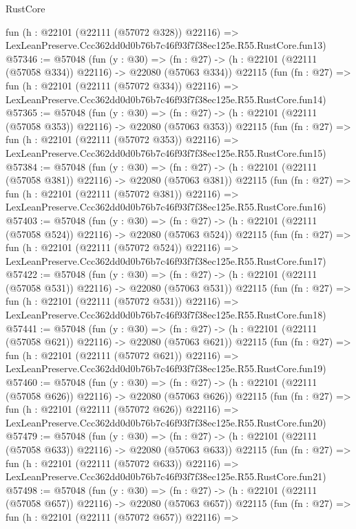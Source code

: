 \begin{lexlean}{RustCore}
\begin{coremodule}
    fun (h : @22101 (@22111 (@57072 @328)) @22116) =>
    LexLeanPreserve.Ccc362dd0d0b76b7c46f93f7f38ec125e.R55.RustCore.fun13)
@57346 := @57048
    (fun (y : @30) =>
    (fn : @27) -> (h : @22101 (@22111 (@57058 @334)) @22116) -> @22080 (@57063 @334))
    @22115
    (fun (fn : @27) =>
    fun (h : @22101 (@22111 (@57072 @334)) @22116) =>
    LexLeanPreserve.Ccc362dd0d0b76b7c46f93f7f38ec125e.R55.RustCore.fun14)
@57365 := @57048
    (fun (y : @30) =>
    (fn : @27) -> (h : @22101 (@22111 (@57058 @353)) @22116) -> @22080 (@57063 @353))
    @22115
    (fun (fn : @27) =>
    fun (h : @22101 (@22111 (@57072 @353)) @22116) =>
    LexLeanPreserve.Ccc362dd0d0b76b7c46f93f7f38ec125e.R55.RustCore.fun15)
@57384 := @57048
    (fun (y : @30) =>
    (fn : @27) -> (h : @22101 (@22111 (@57058 @381)) @22116) -> @22080 (@57063 @381))
    @22115
    (fun (fn : @27) =>
    fun (h : @22101 (@22111 (@57072 @381)) @22116) =>
    LexLeanPreserve.Ccc362dd0d0b76b7c46f93f7f38ec125e.R55.RustCore.fun16)
@57403 := @57048
    (fun (y : @30) =>
    (fn : @27) -> (h : @22101 (@22111 (@57058 @524)) @22116) -> @22080 (@57063 @524))
    @22115
    (fun (fn : @27) =>
    fun (h : @22101 (@22111 (@57072 @524)) @22116) =>
    LexLeanPreserve.Ccc362dd0d0b76b7c46f93f7f38ec125e.R55.RustCore.fun17)
@57422 := @57048
    (fun (y : @30) =>
    (fn : @27) -> (h : @22101 (@22111 (@57058 @531)) @22116) -> @22080 (@57063 @531))
    @22115
    (fun (fn : @27) =>
    fun (h : @22101 (@22111 (@57072 @531)) @22116) =>
    LexLeanPreserve.Ccc362dd0d0b76b7c46f93f7f38ec125e.R55.RustCore.fun18)
@57441 := @57048
    (fun (y : @30) =>
    (fn : @27) -> (h : @22101 (@22111 (@57058 @621)) @22116) -> @22080 (@57063 @621))
    @22115
    (fun (fn : @27) =>
    fun (h : @22101 (@22111 (@57072 @621)) @22116) =>
    LexLeanPreserve.Ccc362dd0d0b76b7c46f93f7f38ec125e.R55.RustCore.fun19)
@57460 := @57048
    (fun (y : @30) =>
    (fn : @27) -> (h : @22101 (@22111 (@57058 @626)) @22116) -> @22080 (@57063 @626))
    @22115
    (fun (fn : @27) =>
    fun (h : @22101 (@22111 (@57072 @626)) @22116) =>
    LexLeanPreserve.Ccc362dd0d0b76b7c46f93f7f38ec125e.R55.RustCore.fun20)
@57479 := @57048
    (fun (y : @30) =>
    (fn : @27) -> (h : @22101 (@22111 (@57058 @633)) @22116) -> @22080 (@57063 @633))
    @22115
    (fun (fn : @27) =>
    fun (h : @22101 (@22111 (@57072 @633)) @22116) =>
    LexLeanPreserve.Ccc362dd0d0b76b7c46f93f7f38ec125e.R55.RustCore.fun21)
@57498 := @57048
    (fun (y : @30) =>
    (fn : @27) -> (h : @22101 (@22111 (@57058 @657)) @22116) -> @22080 (@57063 @657))
    @22115
    (fun (fn : @27) =>
    fun (h : @22101 (@22111 (@57072 @657)) @22116) =>

\end{coremodule}
\end{lexlean}
